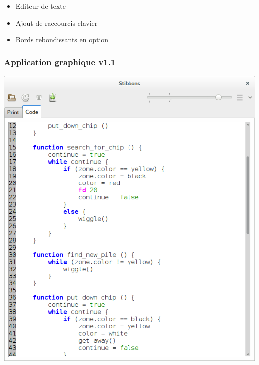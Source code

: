 \begin{frame}
\begin{itemize}
	\item Editeur de texte
	\item Ajout de raccourcis clavier
	\item Bords rebondissants en option
\end{itemize}
\end{frame}

\begin{frame}
\frametitle{Application graphique v1.1}
\begin{center}
\includegraphics[scale=0.16]{doc/report/screenshot/stibbons-0-5-2.png}
~~~~~~~~

\end{center}
\end{frame}
